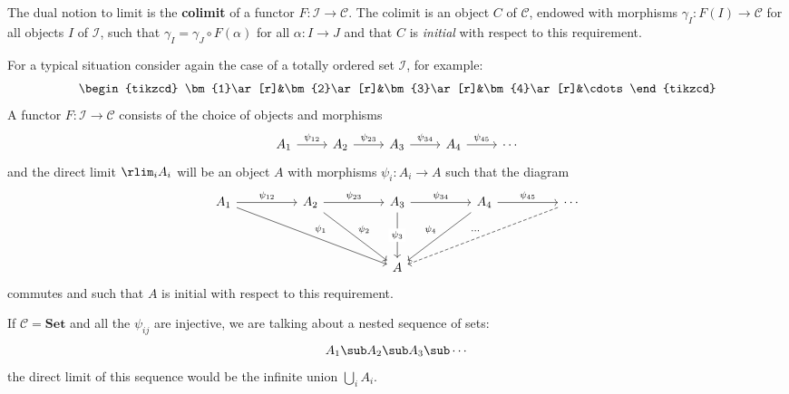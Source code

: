 The dual notion to limit is the \textbf{colimit} of a functor $F:\mathcal{I}\to\mathcal{C}$. The colimit is an object $C$ of $\mathcal{C}$, endowed with morphisms $\gamma_I:F(I)\to\mathcal{C}$ for all objects $I$ of $\mathcal{I}$, such that $\gamma_I=\gamma_J\circ F(\alpha)$ for all $\alpha:I\to J$ and that $C$ is \textit{initial} with respect to this requirement.\par
\begin{example}

For a typical situation consider again the case of a totally ordered set $\mathcal{I}$, for example:
\[\begin{tikzcd}
\bm{1}\ar[r]&\bm{2}\ar[r]&\bm{3}\ar[r]&\bm{4}\ar[r]&\cdots
\end{tikzcd}\]
A functor $F:\mathcal{I}\to\mathcal{C}$ consists of the choice of objects and morphisms
\[\begin{tikzcd}
A_1\ar[r,"\psi_{12}"]&A_2\ar[r,"\psi_{23}"]&A_3\ar[r,"\psi_{34}"]&A_4\ar[r,"\psi_{45}"]&\cdots
\end{tikzcd}\]
and the direct limit $\rlim_iA_i$ will be an object $A$ with morphisms $\psi_i:A_i\to A$ such
that the diagram
\[\begin{tikzcd}
A_1\ar[rrrrdd,"\psi_1"]\ar[rr,"\psi_{12}"]&&A_2\ar[rr,"\psi_{23}"]\ar[rrdd,"\psi_2"]&&A_3\ar[dd,"\psi_3" description]\ar[rr,"\psi_{34}"]&&A_4\ar[rr,"\psi_{45}"]\ar[lldd,swap,"\psi_4"]&&\cdots\ar[lllldd,dashed,swap,"\cdots"]\\
&&&&\\
&&&&A&&&&
\end{tikzcd}\]
commutes and such that $A$ is initial with respect to this requirement.
\end{example}
\begin{example}
If $\mathcal{C }=\mathbf{Set}$ and all the $\psi_{ij}$ are injective, we are talking about a nested sequence of sets:
\[A_1\sub A_2\sub A_3\sub\cdots\]
the direct limit of this sequence would be the infinite union $\bigcup_iA_i$.
\end{example}
